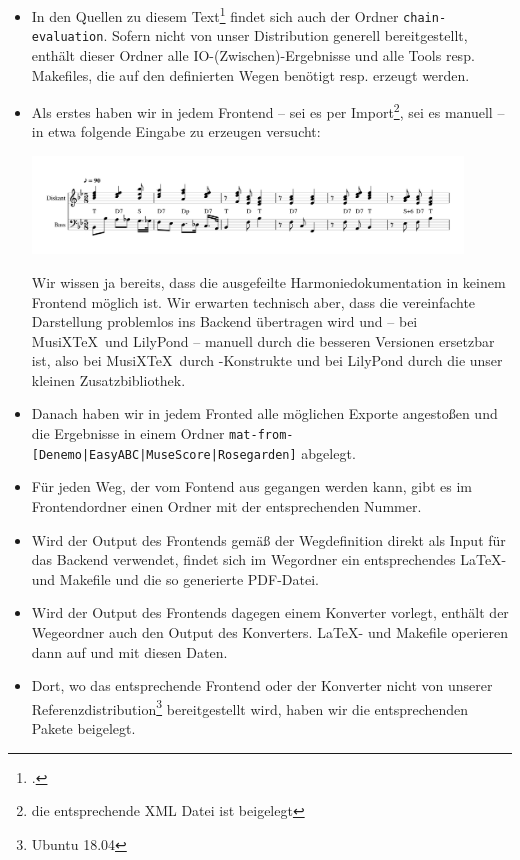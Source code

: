 \begin{itemize}
  \item In den Quellen zu diesem Text\footcite[vgl.][\nopage wp]{Reincke2019a}
  findet sich auch der Ordner \texttt{chain-evaluation}. Sofern nicht von unser
  Distribution generell bereitgestellt, enthält dieser Ordner alle
  IO-(Zwischen)-Ergebnisse und alle Tools resp. Makefiles, die auf den
  definierten Wegen benötigt resp. erzeugt werden.
  \item Als erstes haben wir in jedem Frontend -- sei es per Import\footnote{die
  entsprechende XML Datei ist beigelegt}, sei es manuell -- in etwa folgende
  Eingabe zu erzeugen versucht:
  \begin{center}
    \includegraphics[width=0.9\textwidth]{frontends/musescore/cadenca3-musescore-300dpi.png}
  \end{center}
  Wir wissen ja bereits, dass die ausgefeilte Harmoniedokumentation in keinem
  Frontend möglich ist. Wir erwarten technisch aber, dass die vereinfachte
  Darstellung problemlos ins Backend übertragen wird und -- bei MusiX\TeX\ und
  LilyPond -- manuell durch die besseren Versionen ersetzbar ist, also
  bei MusiX\TeX\ durch -Konstrukte und bei LilyPond durch die unser
  kleinen Zusatzbibliothek.
  \item Danach haben wir in jedem Fronted alle möglichen Exporte angestoßen und
  die Ergebnisse in einem Ordner \texttt{mat-from-[Denemo|EasyABC|MuseScore|Rosegarden]} abgelegt.
  \item Für jeden Weg, der vom Fontend aus gegangen werden kann, gibt es im
  Frontendordner einen Ordner mit der entsprechenden Nummer.
  \item Wird der Output des Frontends gemäß der Wegdefinition direkt als Input für
  das Backend verwendet, findet sich im Wegordner ein entsprechendes \LaTeX- und
  Makefile und die so generierte PDF-Datei.
  \item Wird der Output des Frontends dagegen einem Konverter vorlegt, enthält
  der Wegeordner auch den Output des Konverters. \LaTeX- und Makefile
  operieren dann auf und mit diesen Daten.
  \item Dort, wo das entsprechende Frontend oder der Konverter nicht von unserer
  Referenzdistribution\footnote{Ubuntu 18.04} bereitgestellt wird, haben wir die
  entsprechenden Pakete beigelegt.
\end{itemize}

